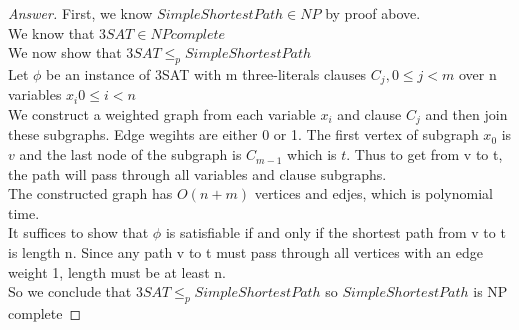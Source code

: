 \documentclass[11pt]{article}
\theoremstyle{definition}
\theoremstyle{definition}
\theoremstyle{definition}
\begin{document}
\begin{proof}[Answer]

First, we know $SimpleShortestPath \in NP$ by proof above. \\
We know that $3SAT \in NPcomplete$\\
We now show that $3SAT  \leq_{p} SimpleShortestPath$ \\


Let $\phi$ be an instance of 3SAT with m three-literals clauses $C_j , 0 \leq j < m$ over n variables $x_i 0 \leq i < n$\\

We construct a weighted graph from each variable $x_i$ and clause $C_j$ and then join these subgraphs. Edge wegihts are either 0 or 1. The first vertex of subgraph $x_0$ is $v$ and the last node of the subgraph is $C_{m-1}$ which is $t$. Thus to get from v to t, the path will pass through all variables and clause subgraphs.\\

The constructed graph has $O(n+m)$ vertices and edjes, which is polynomial time. \\

It suffices to show that $\phi$ is satisfiable if and only if the shortest path from v to t is length n. Since any path v to t must pass through all vertices with an edge weight 1, length must be at least n. \\ 

So we conclude that $3SAT  \leq_{p} SimpleShortestPath$ so $SimpleShortestPath$ is NP complete 

\end{proof}
\end{document}

